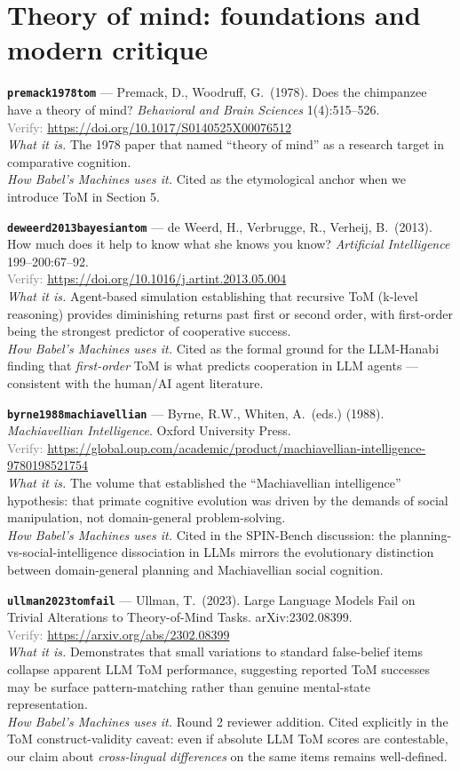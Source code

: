 \documentclass[11pt,a4paper]{article}
\newcommand{\entry}[5]{%
  \par\smallskip
  \noindent\textbf{\texttt{#1}} --- #2\\
  {\footnotesize \textcolor{gray}{Verify:} \url{#3}}\\
  \textit{What it is.} #4\\
  \textit{How Babel's Machines uses it.} #5
  \par\medskip
}
\begin{document}
\section{Theory of mind: foundations and modern critique}

\entry{premack1978tom}
{Premack, D., Woodruff, G.\ (1978). Does the chimpanzee have a theory of mind? \emph{Behavioral and Brain Sciences} 1(4):515--526.}
{https://doi.org/10.1017/S0140525X00076512}
{The 1978 paper that named ``theory of mind'' as a research target in comparative cognition.}
{Cited as the etymological anchor when we introduce ToM in Section 5.}

\entry{deweerd2013bayesiantom}
{de Weerd, H., Verbrugge, R., Verheij, B.\ (2013). How much does it help to know what she knows you know? \emph{Artificial Intelligence} 199--200:67--92.}
{https://doi.org/10.1016/j.artint.2013.05.004}
{Agent-based simulation establishing that recursive ToM (k-level reasoning) provides diminishing returns past first or second order, with first-order being the strongest predictor of cooperative success.}
{Cited as the formal ground for the LLM-Hanabi finding that \emph{first-order} ToM is what predicts cooperation in LLM agents --- consistent with the human/AI agent literature.}

\entry{byrne1988machiavellian}
{Byrne, R.W., Whiten, A.\ (eds.) (1988). \emph{Machiavellian Intelligence}. Oxford University Press.}
{https://global.oup.com/academic/product/machiavellian-intelligence-9780198521754}
{The volume that established the ``Machiavellian intelligence'' hypothesis: that primate cognitive evolution was driven by the demands of social manipulation, not domain-general problem-solving.}
{Cited in the SPIN-Bench discussion: the planning-vs-social-intelligence dissociation in LLMs mirrors the evolutionary distinction between domain-general planning and Machiavellian social cognition.}

\entry{ullman2023tomfail}
{Ullman, T.\ (2023). Large Language Models Fail on Trivial Alterations to Theory-of-Mind Tasks. arXiv:2302.08399.}
{https://arxiv.org/abs/2302.08399}
{Demonstrates that small variations to standard false-belief items collapse apparent LLM ToM performance, suggesting reported ToM successes may be surface pattern-matching rather than genuine mental-state representation.}
{Round 2 reviewer addition. Cited explicitly in the ToM construct-validity caveat: even if absolute LLM ToM scores are contestable, our claim about \emph{cross-lingual differences} on the same items remains well-defined.}
\end{document}
